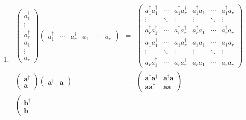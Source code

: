 \documentclass[aps,preprint]{revtex4}
\begin{document}
\begin{enumerate}
\item 
\begin{eqnarray}
\left( 
\begin{array}{c}
a_{1}^{\dagger } \\ 
\vdots \\ 
a_{r}^{\dagger } \\ 
a_{1} \\ 
\vdots \\ 
a_{r}%
\end{array}%
\right) \left( 
\begin{array}{cccccc}
a_{1}^{\dagger } & \cdots & a_{r}^{\dagger } & a_{1} & \cdots & a_{r}%
\end{array}%
\right) &=&\left( 
\begin{array}{cccccc}
a_{1}^{\dagger }a_{1}^{\dagger } & \cdots & a_{1}^{\dagger }a_{r}^{\dagger }
& a_{1}^{\dagger }a_{1} & \cdots & a_{1}^{\dagger }a_{r} \\ 
\vdots & \ddots & \vdots & \vdots & \ddots & \vdots \\ 
a_{r}^{\dagger }a_{1}^{\dagger } & \cdots & a_{r}^{\dagger }a_{r}^{\dagger }
& a_{r}^{\dagger }a_{1} & \cdots & a_{r}^{\dagger }a_{r} \\ 
a_{1}a_{1}^{\dagger } & \cdots & a_{1}a_{r}^{\dagger } & a_{1}a_{1} & \cdots
& a_{1}a_{r} \\ 
\vdots & \ddots & \vdots & \vdots & \ddots & \vdots \\ 
a_{r}a_{1}^{\dagger } & \cdots & a_{r}a_{r}^{\dagger } & a_{r}a_{1} & \cdots
& a_{r}a_{r}%
\end{array}%
\right) \\
\left( 
\begin{array}{c}
\boldsymbol{a}^{\dagger } \\ 
\boldsymbol{a}%
\end{array}%
\right) \left( 
\begin{array}{cc}
\boldsymbol{a}^{\dagger } & \boldsymbol{a}%
\end{array}%
\right) &=&\left( 
\begin{array}{cc}
\boldsymbol{a}^{\dagger }\boldsymbol{a}^{\dagger } & \boldsymbol{a}^{\dagger
}\boldsymbol{a} \\ 
\boldsymbol{aa}^{\dagger } & \boldsymbol{aa}%
\end{array}%
\right) \\
\left( 
\begin{array}{c}
\boldsymbol{b}^{\dagger } \\ 
\boldsymbol{b}%
\end{array}%

\end{eqnarray}
\end{enumerate}
\end{document}
